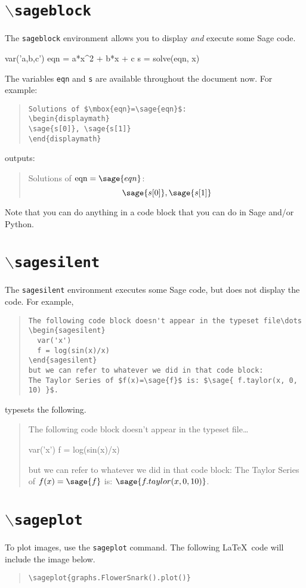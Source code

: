 \documentclass{article}
\def\bs{\ensuremath{\backslash}}
\begin{document}
\section{\texttt{{\bs}sageblock}}

The \texttt{sageblock} environment allows you to display \emph{and}
execute some Sage code.
\begin{sageblock}
 var('a,b,c')
 eqn = a*x^2 + b*x + c
 s = solve(eqn, x)
\end{sageblock}
The variables \texttt{eqn} and \texttt{s} are available throughout
the document now. For example:

\begin{quote}
\begin{verbatim}
Solutions of $\mbox{eqn}=\sage{eqn}$:
\begin{displaymath}
\sage{s[0]}, \sage{s[1]}
\end{displaymath}
\end{verbatim}
\end{quote}
outputs:
\begin{quote}
Solutions of $\mbox{eqn}=\sage{eqn}$:
\begin{displaymath}
\sage{s[0]}, \sage{s[1]}
\end{displaymath}
\end{quote}

Note that you can do anything in a code block that you can do in Sage and/or
Python. 

\section{\texttt{{\bs}sagesilent}}

The \texttt{sagesilent} environment executes some Sage code, but does not
display the code. For example,

\begin{quote}
\begin{verbatim}
The following code block doesn't appear in the typeset file\dots
\begin{sagesilent}
  var('x')
  f = log(sin(x)/x)
\end{sagesilent}
but we can refer to whatever we did in that code block:
The Taylor Series of $f(x)=\sage{f}$ is: $\sage{ f.taylor(x, 0, 10) }$.
\end{verbatim}
\end{quote}
typesets the following.

\begin{quote}
The following code block doesn't appear in the typeset file\dots
\begin{sagesilent}
  var('x')
  f = log(sin(x)/x)
\end{sagesilent}
but we can refer to whatever we did in that code block:
The Taylor Series of $f(x)=\sage{f}$ is: $\sage{ f.taylor(x, 0, 10) }$.
\end{quote}

\section{\texttt{{\bs}sageplot}}

To plot images, use the \texttt{sageplot} command.
The following \LaTeX\ code will include the image below.
\begin{quote}
\begin{verbatim}
\sageplot{graphs.FlowerSnark().plot()}
\end{verbatim}
\end{quote}

\end{document}
